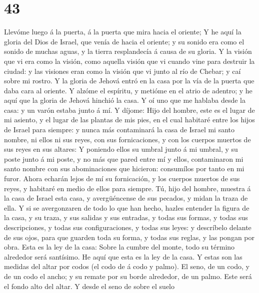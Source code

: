 \hypertarget{section-42}{%
\section{43}\label{section-42}}

 Llevóme luego á la puerta, á la puerta que mira hacia el
oriente;  Y he aquí la gloria del Dios de Israel, que
venía de hacia el oriente; y su sonido era como el sonido de muchas
aguas, y la tierra resplandecía á causa de su gloria.  Y
la visión que vi era como la visión, como aquella visión que vi cuando
vine para destruir la ciudad: y las visiones eran como la visión que vi
junto al río de Chebar; y caí sobre mi rostro.  Y la
gloria de Jehová entró en la casa por la vía de la puerta que daba cara
al oriente.  Y alzóme el espíritu, y metióme en el atrio
de adentro; y he aquí que la gloria de Jehová hinchió la casa.
 Y oí uno que me hablaba desde la casa: y un varón estaba
junto á mí.  Y díjome: Hijo del hombre, este es el lugar
de mi asiento, y el lugar de las plantas de mis pies, en el cual
habitaré entre los hijos de Israel para siempre: y nunca más contaminará
la casa de Israel mi santo nombre, ni ellos ni sus reyes, con sus
fornicaciones, y con los cuerpos muertos de sus reyes en sus altares:
 Y poniendo ellos su umbral junto á mi umbral, y su poste
junto á mi poste, y no más que pared entre mí y ellos, contaminaron mi
santo nombre con sus abominaciones que hicieron: consumílos por tanto en
mi furor.  Ahora echarán lejos de mí su fornicación, y los
cuerpos muertos de sus reyes, y habitaré en medio de ellos para siempre.
 Tú, hijo del hombre, muestra á la casa de Israel esta
casa, y avergüéncense de sus pecados, y midan la traza de ella.
 Y si se avergonzaren de todo lo que han hecho, hazles
entender la figura de la casa, y su traza, y sus salidas y sus entradas,
y todas sus formas, y todas sus descripciones, y todas sus
configuraciones, y todas sus leyes: y descríbelo delante de sus ojos,
para que guarden toda su forma, y todas sus reglas, y las pongan por
obra.  Esta es la ley de la casa: Sobre la cumbre del
monte, todo su término alrededor será santísimo. He aquí que esta es la
ley de la casa.  Y estas son las medidas del altar por
codos (el codo de á codo y palmo). El seno, de un codo, y de un codo el
ancho; y su remate por su borde alrededor, de un palmo. Este será el
fondo alto del altar.  Y desde el seno de sobre el suelo
